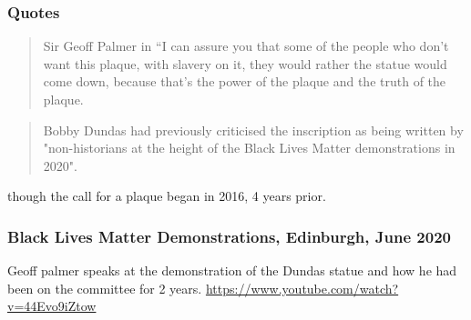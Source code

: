 \documentclass{scrartcl}
\begin{document}



\subsubsection{Quotes}
\begin{quotation}{Sir Geoff Palmer in \cite{anderson_2021}}
    “I can assure you that some of the people who don’t want this plaque, with slavery on it, they would rather the statue would come down, because that’s the power of the plaque and the truth of the plaque.
\end{quotation}
\begin{quote}
    Bobby Dundas had previously criticised the inscription as being written by "non-historians at the height of the Black Lives Matter demonstrations in 2020".
\end{quote}\cite{bbc_2024} though the call for a plaque began in 2016, 4 years prior.

\subsubsection{Black Lives Matter Demonstrations, Edinburgh, June 2020}

Geoff palmer speaks at the demonstration of the Dundas statue and how he had been on the committee for 2 years. \url{https://www.youtube.com/watch?v=44Evo9iZtow}
\end{document}
